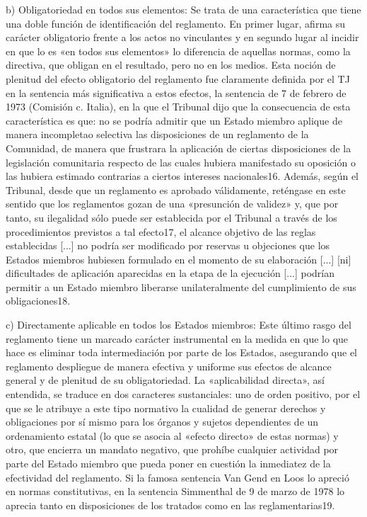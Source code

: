 \documentclass[10pt,a4paper]{article}
\begin{document}
b) Obligatoriedad en todos sus elementos: Se trata de una característica que tiene una doble función de identificación del reglamento. En primer lugar, afirma su carácter obligatorio frente a los actos no vinculantes y en segundo lugar al incidir en que lo es «en todos sus elementos» lo diferencia de aquellas normas, como la directiva, que obligan en el resultado, pero no en los medios. Esta noción de plenitud del efecto obligatorio del reglamento fue claramente definida por el TJ en la sentencia más significativa a estos efectos, la sentencia de 7 de febrero de 1973 (Comisión c. Italia), en la que el Tribunal dijo que la consecuencia de esta característica es que: no se podría admitir que un Estado miembro aplique de manera incompletao selectiva las disposiciones de un reglamento de la Comunidad, de manera que frustrara la aplicación de ciertas disposiciones de la legislación comunitaria respecto de las cuales hubiera manifestado su oposición o las hubiera estimado contrarias a ciertos intereses nacionales16. Además, según el Tribunal, desde que un reglamento es aprobado válidamente, reténgase en este sentido que los reglamentos gozan de una «presunción de validez» y, que por tanto, su ilegalidad sólo puede ser establecida por el Tribunal a través de los procedimientos previstos a tal efecto17, el alcance objetivo de las reglas establecidas [...] no podría ser modificado por reservas u objeciones que los Estados miembros hubiesen formulado en el momento de su elaboración [...] [ni] dificultades de aplicación aparecidas en la etapa de la ejecución [...] podrían permitir a un Estado miembro liberarse unilateralmente del cumplimiento de sus obligaciones18.

c) Directamente aplicable en todos los Estados miembros: Este último rasgo del reglamento tiene un marcado carácter instrumental en la medida en que lo que hace es eliminar toda intermediación por parte de los Estados, asegurando que el reglamento despliegue de manera efectiva y uniforme sus efectos de alcance general y de plenitud de su obligatoriedad. La «aplicabilidad directa», así entendida, se traduce en dos caracteres sustanciales: uno de orden positivo, por el que se le atribuye a este tipo normativo la cualidad de generar derechos y obligaciones por sí mismo para los órganos y sujetos dependientes de un ordenamiento estatal (lo que se asocia al «efecto directo» de estas normas) y otro, que encierra un mandato negativo, que prohíbe cualquier actividad por parte del Estado miembro que pueda poner en cuestión la inmediatez de la efectividad del reglamento. Si la famosa sentencia Van Gend en Loos lo apreció en normas constitutivas, en la sentencia Simmenthal de 9 de marzo de 1978 lo aprecia tanto en disposiciones de los tratados como en las reglamentarias19.
\end{document}
